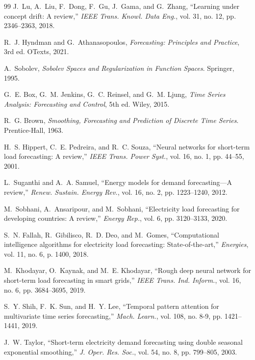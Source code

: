 \documentclass[10pt,twocolumn,letterpaper]{article}
\begin{document}
\begin{thebibliography}{99}
J.~Lu, A.~Liu, F.~Dong, F.~Gu, J.~Gama, and G.~Zhang, ``Learning under concept drift: A review,'' \emph{IEEE Trans. Knowl. Data Eng.}, vol. 31, no. 12, pp. 2346--2363, 2018.

R.~J. Hyndman and G.~Athanasopoulos, \emph{Forecasting: Principles and Practice}, 3rd ed. OTexts, 2021.

A.~Sobolev, \emph{Sobolev Spaces and Regularization in Function Spaces}. Springer, 1995.

G.~E. Box, G.~M. Jenkins, G.~C. Reinsel, and G.~M. Ljung, \emph{Time Series Analysis: Forecasting and Control}, 5th ed. Wiley, 2015.

R.~G. Brown, \emph{Smoothing, Forecasting and Prediction of Discrete Time Series}. Prentice-Hall, 1963.

H.~S. Hippert, C.~E. Pedreira, and R.~C. Souza, ``Neural networks for short-term load forecasting: A review,'' \emph{IEEE Trans. Power Syst.}, vol. 16, no. 1, pp. 44--55, 2001.

L.~Suganthi and A.~A. Samuel, ``Energy models for demand forecasting---A review,'' \emph{Renew. Sustain. Energy Rev.}, vol. 16, no. 2, pp. 1223--1240, 2012.

M.~Sobhani, A.~Ansaripour, and M.~Sobhani, ``Electricity load forecasting for developing countries: A review,'' \emph{Energy Rep.}, vol. 6, pp. 3120--3133, 2020.

S.~N. Fallah, R.~Gibilisco, R.~D. Deo, and M.~Gomes, ``Computational intelligence algorithms for electricity load forecasting: State-of-the-art,'' \emph{Energies}, vol. 11, no. 6, p. 1400, 2018.

M.~Khodayar, O.~Kaynak, and M.~E. Khodayar, ``Rough deep neural network for short-term load forecasting in smart grids,'' \emph{IEEE Trans. Ind. Inform.}, vol. 16, no. 6, pp. 3684--3695, 2019.

S.~Y. Shih, F.~K. Sun, and H.~Y. Lee, ``Temporal pattern attention for multivariate time series forecasting,'' \emph{Mach. Learn.}, vol. 108, no. 8-9, pp. 1421--1441, 2019.

J.~W. Taylor, ``Short-term electricity demand forecasting using double seasonal exponential smoothing,'' \emph{J. Oper. Res. Soc.}, vol. 54, no. 8, pp. 799--805, 2003.


\end{thebibliography}
\end{document}
